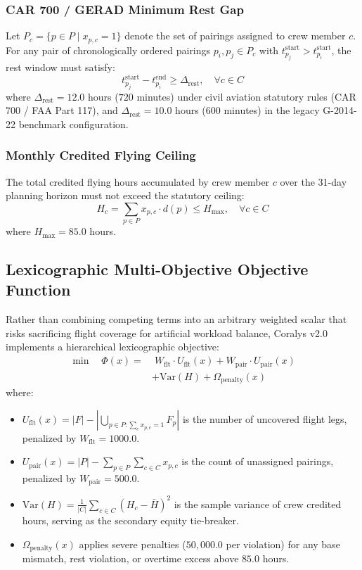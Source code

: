 \documentclass[journal]{IEEEtran}
\begin{document}
\subsubsection{CAR 700 / GERAD Minimum Rest Gap}
Let $P_c = \{p \in P \mid x_{p,c} = 1\}$ denote the set of pairings assigned to crew member $c$. For any pair of chronologically ordered pairings $p_i, p_j \in P_c$ with $t^{\text{start}}_{p_j} > t^{\text{start}}_{p_i}$, the rest window must satisfy:
\begin{equation}
t^{\text{start}}_{p_j} - t^{\text{end}}_{p_i} \ge \Delta_{\text{rest}}, \quad \forall c \in C
\end{equation}
where $\Delta_{\text{rest}} = 12.0$ hours ($720$ minutes) under civil aviation statutory rules (CAR 700 / FAA Part 117), and $\Delta_{\text{rest}} = 10.0$ hours ($600$ minutes) in the legacy G-2014-22 benchmark configuration.

\subsubsection{Monthly Credited Flying Ceiling}
The total credited flying hours accumulated by crew member $c$ over the 31-day planning horizon must not exceed the statutory ceiling:
\begin{equation}
H_c = \sum_{p \in P} x_{p,c} \cdot d(p) \le H_{\max}, \quad \forall c \in C
\end{equation}
where $H_{\max} = 85.0$ hours.

\subsection{Lexicographic Multi-Objective Objective Function}

Rather than combining competing terms into an arbitrary weighted scalar that risks sacrificing flight coverage for artificial workload balance, Coralys v2.0 implements a hierarchical lexicographic objective:
\begin{equation}
\begin{aligned}
\min \quad \Phi(x) = & \; W_{\text{flt}} \cdot U_{\text{flt}}(x) + W_{\text{pair}} \cdot U_{\text{pair}}(x) \\
& + \text{Var}(H) + \Omega_{\text{penalty}}(x)
\end{aligned}
\end{equation}
where:
\begin{itemize}
    \item $U_{\text{flt}}(x) = |F| - |\bigcup_{p \in P : \sum_c x_{p,c}=1} F_p|$ is the number of uncovered flight legs, penalized by $W_{\text{flt}} = 1000.0$.
    \item $U_{\text{pair}}(x) = |P| - \sum_{p \in P} \sum_{c \in C} x_{p,c}$ is the count of unassigned pairings, penalized by $W_{\text{pair}} = 500.0$.
    \item $\text{Var}(H) = \frac{1}{|C|} \sum_{c \in C} (H_c - \bar{H})^2$ is the sample variance of crew credited hours, serving as the secondary equity tie-breaker.
    \item $\Omega_{\text{penalty}}(x)$ applies severe penalties ($50,000.0$ per violation) for any base mismatch, rest violation, or overtime excess above $85.0$ hours.
\end{itemize}
\end{document}
